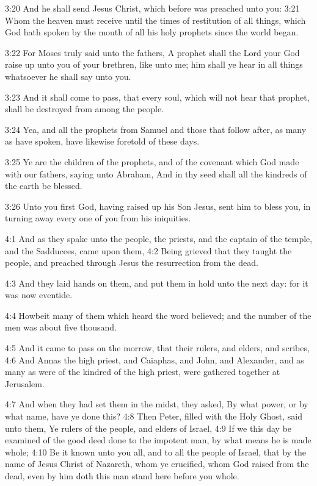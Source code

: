 3:20 And he shall send Jesus Christ, which before was preached unto
you: 3:21 Whom the heaven must receive until the times of restitution
of all things, which God hath spoken by the mouth of all his holy
prophets since the world began.

3:22 For Moses truly said unto the fathers, A prophet shall the Lord
your God raise up unto you of your brethren, like unto me; him shall
ye hear in all things whatsoever he shall say unto you.

3:23 And it shall come to pass, that every soul, which will not hear
that prophet, shall be destroyed from among the people.

3:24 Yea, and all the prophets from Samuel and those that follow
after, as many as have spoken, have likewise foretold of these days.

3:25 Ye are the children of the prophets, and of the covenant which
God made with our fathers, saying unto Abraham, And in thy seed shall
all the kindreds of the earth be blessed.

3:26 Unto you first God, having raised up his Son Jesus, sent him to
bless you, in turning away every one of you from his iniquities.

4:1 And as they spake unto the people, the priests, and the captain of
the temple, and the Sadducees, came upon them, 4:2 Being grieved that
they taught the people, and preached through Jesus the resurrection
from the dead.

4:3 And they laid hands on them, and put them in hold unto the next
day: for it was now eventide.

4:4 Howbeit many of them which heard the word believed; and the number
of the men was about five thousand.

4:5 And it came to pass on the morrow, that their rulers, and elders,
and scribes, 4:6 And Annas the high priest, and Caiaphas, and John,
and Alexander, and as many as were of the kindred of the high priest,
were gathered together at Jerusalem.

4:7 And when they had set them in the midst, they asked, By what
power, or by what name, have ye done this?  4:8 Then Peter, filled
with the Holy Ghost, said unto them, Ye rulers of the people, and
elders of Israel, 4:9 If we this day be examined of the good deed done
to the impotent man, by what means he is made whole; 4:10 Be it known
unto you all, and to all the people of Israel, that by the name of
Jesus Christ of Nazareth, whom ye crucified, whom God raised from the
dead, even by him doth this man stand here before you whole.


